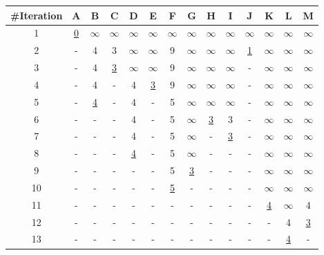 \documentclass[a4paper,graphics,11pt]{article}
\begin{document}
\begin{tabular}{c|*{12}{c|}c}
    \#Iteration     & A     & B     & C     & D     & E     & F     & G     & H     & I     & J     & K     & L     & M\\
    \hline
    1               & \underline{0} &$\infty$&$\infty$&$\infty$&$\infty$&$\infty$&$\infty$&$\infty$&$\infty$&$\infty$&$\infty$&$\infty$&$\infty$\\
    \hline
    2               & -     & 4     & 3     &$\infty$&$\infty$& 9     &$\infty$&$\infty$&$\infty$& \underline{1}    &$\infty$&$\infty$&$\infty$\\
    \hline
    3               & -     & 4     & \underline{3} & $\infty$& $\infty$& 9     & $\infty$& $\infty$& $\infty$& -     & $\infty$& $\infty$& $\infty$\\
    \hline
    4               & -     & 4     & -     & 4     & \underline{3} & 9     & $\infty$& $\infty$& $\infty$& -     & $\infty$& $\infty$& $\infty$\\
    \hline
    5               & -     & \underline{4} & -     & 4     & -     & 5     & $\infty$& $\infty$& $\infty$& -     & $\infty$& $\infty$& $\infty$\\
    \hline
    6               & -     & -     & -     & 4     & -     & 5     & $\infty$& \underline{3} & 3     & -     & $\infty$& $\infty$& $\infty$\\
    \hline
    7               & -     & -     & -     & 4     & -     & 5     & $\infty$& -     & \underline{3} & -     & $\infty$& $\infty$& $\infty$\\
    \hline
    8               & -     & -     & -     & \underline{4} & -     & 5     & $\infty$& -     & -   & -     & $\infty$& $\infty$& $\infty$\\
    \hline
    9               & -     & -     & -     & -     & -     & 5     & \underline{3} & -     & -   & -     & $\infty$& $\infty$& $\infty$\\
    \hline
    10              & -     & -     & -     & -     & -     & \underline{5} & -     & -     & -   & -     & $\infty$& $\infty$& $\infty$\\
    \hline
    11              & -     & -     & -     & -     & -     & -     & -     & -     & -   & -     & \underline{4}   & $\infty$& 4\\
    \hline
    12              & -     & -     & -     & -     & -     & -     & -     & -     & -   & -     & -   & 4 & \underline{3}\\
    \hline
    13              & -     & -     & -     & -     & -     & -     & -     & -     & -   & -     & -   & \underline{4} & -\\
\end{tabular}
\end{document}
